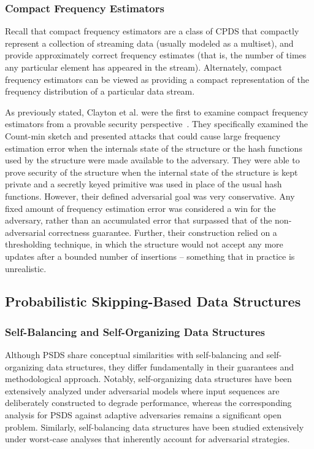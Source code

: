 \subsubsection{Compact Frequency Estimators}

Recall that compact frequency estimators are a class of CPDS that compactly represent a collection of streaming data (usually modeled as a multiset), and provide approximately correct frequency estimates (that is, the number of times any particular element has appeared in the stream). Alternately, compact frequency estimators can be viewed as providing a compact representation of the frequency distribution of a particular data stream. 

As previously stated, Clayton et al. were the first to examine compact frequency estimators from a provable security perspective~\cite{clayton2019}. They specifically examined the Count-min sketch and presented attacks that could cause large frequency estimation error when the internals state of the structure or the hash functions used by the structure were made available to the adversary. They were able to prove security of the structure when the internal state of the structure is kept private and a secretly keyed primitive was used in place of the usual hash functions. However, their defined adversarial goal was very conservative. Any fixed amount of frequency estimation error was considered a win for the adversary, rather than an accumulated error that surpassed that of the non-adversarial correctness guarantee. Further, their construction relied on a thresholding technique, in which the structure would not accept any more updates after a bounded number of insertions -- something that in practice is unrealistic.  

\subsection{Probabilistic Skipping-Based Data Structures}

\subsubsection{Self-Balancing and Self-Organizing Data Structures}

Although PSDS share conceptual similarities with self-balancing and self-organizing data structures, they differ fundamentally in their guarantees and methodological approach. 
Notably, self-organizing data structures have been extensively analyzed under adversarial models where input sequences are deliberately constructed to degrade performance, whereas the corresponding analysis for PSDS against adaptive adversaries remains a significant open problem. Similarly, self-balancing data structures have been studied extensively under worst-case analyses that inherently account for adversarial strategies.

